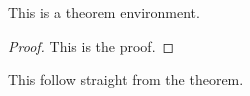 \documentclass{article}
\begin{document}


  \begin{theorem}
    This is a theorem environment.
  \end{theorem}
  \begin{proof}
    This is the proof.
  \end{proof}

  \begin{corollary}
    This follow straight from the theorem.
  \end{corollary}
\end{document}
